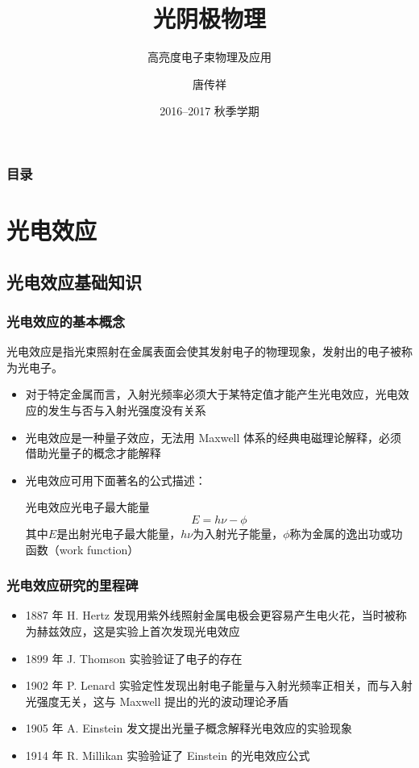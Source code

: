 \documentclass[ignorenonframetext, t]{beamer}
\title{光阴极物理}
\subtitle{高亮度电子束物理及应用}
\author{唐传祥}
\institute{清华大学工程物理系}
\date{2016--2017 秋季学期}
\begin{document}
\begin{frame}
  \titlepage
\end{frame}

\begin{frame}
  \frametitle{目录}
  \begin{multicols}{2}
  \tableofcontents
  \end{multicols}
\end{frame}

\section{光电效应}

\subsection{光电效应基础知识}

\begin{frame}
  \frametitle{光电效应的基本概念}
  \begin{concept}
  	\alert{光电效应}是指光束照射在金属表面会使其发射电子的物理现象，发射出的电子被称为\alert{光电子}。
	\end{concept}
  \begin{itemize}
	  \item 对于特定金属而言，入射光频率必须大于某特定值才能产生光电效应，光电效应的发生与否与入射光强度没有关系
	  \item 光电效应是一种量子效应，无法用 Maxwell 体系的经典电磁理论解释，必须借助\alert{光量子}的概念才能解释
	  \item 光电效应可用下面著名的公式描述：
	  \begin{formula}{光电效应光电子最大能量}
	  \[
	  E = h\nu-\phi
	  \]
	  \scriptsize{其中$E$是出射光电子最大能量，$h\nu$为入射光子能量，$\phi$称为金属的逸出功或功函数（work function）}
	  \end{formula}
  \end{itemize}
\end{frame}

\begin{frame}
  \frametitle{光电效应研究的里程碑}
  \begin{itemize}
	  \item 1887 年 H. Hertz 发现用紫外线照射金属电极会更容易产生电火花，当时被称为赫兹效应，这是实验上首次发现光电效应
	  \item 1899 年 J. Thomson 实验验证了电子的存在
	  \item 1902 年 P. Lenard 实验定性发现出射电子能量与入射光频率正相关，而与入射光强度无关，这与 Maxwell 提出的光的波动理论矛盾
		\item 1905 年 A. Einstein 发文提出光量子概念解释光电效应的实验现象
		\item 1914 年 R. Millikan 实验验证了 Einstein 的光电效应公式
  \end{itemize}
\end{frame}
\end{document}
